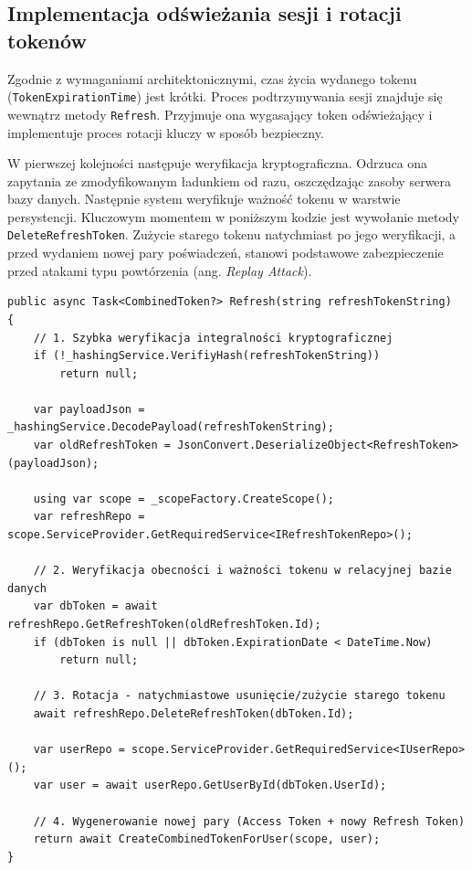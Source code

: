 \documentclass{SGGW-thesis}
\begin{document}
\subsection{Implementacja odświeżania sesji i rotacji tokenów}

Zgodnie z wymaganiami architektonicznymi, czas życia wydanego tokenu (\texttt{TokenExpirationTime}) jest krótki. Proces podtrzymywania sesji znajduje się wewnątrz metody \texttt{Refresh}. Przyjmuje ona wygasający token odświeżający i implementuje proces rotacji kluczy w sposób bezpieczny.

W pierwszej kolejności następuje weryfikacja kryptograficzna. Odrzuca ona zapytania ze zmodyfikowanym ładunkiem od razu, oszczędzając zasoby serwera bazy danych. Następnie system weryfikuje ważność tokenu w warstwie persystencji. Kluczowym momentem w poniższym kodzie jest wywołanie metody \texttt{DeleteRefreshToken}. Zużycie starego tokenu natychmiast po jego weryfikacji, a przed wydaniem nowej pary poświadczeń, stanowi podstawowe zabezpieczenie przed atakami typu powtórzenia (ang. \textit{Replay Attack}).

\begin{verbatim}
public async Task<CombinedToken?> Refresh(string refreshTokenString)
{
    // 1. Szybka weryfikacja integralności kryptograficznej
    if (!_hashingService.VerifiyHash(refreshTokenString))
        return null;

    var payloadJson = _hashingService.DecodePayload(refreshTokenString);
    var oldRefreshToken = JsonConvert.DeserializeObject<RefreshToken>(payloadJson);

    using var scope = _scopeFactory.CreateScope();
    var refreshRepo = scope.ServiceProvider.GetRequiredService<IRefreshTokenRepo>();
    
    // 2. Weryfikacja obecności i ważności tokenu w relacyjnej bazie danych
    var dbToken = await refreshRepo.GetRefreshToken(oldRefreshToken.Id);
    if (dbToken is null || dbToken.ExpirationDate < DateTime.Now)
        return null;

    // 3. Rotacja - natychmiastowe usunięcie/zużycie starego tokenu
    await refreshRepo.DeleteRefreshToken(dbToken.Id);

    var userRepo = scope.ServiceProvider.GetRequiredService<IUserRepo>();
    var user = await userRepo.GetUserById(dbToken.UserId);

    // 4. Wygenerowanie nowej pary (Access Token + nowy Refresh Token)
    return await CreateCombinedTokenForUser(scope, user);
}
\end{verbatim}
\end{document}
